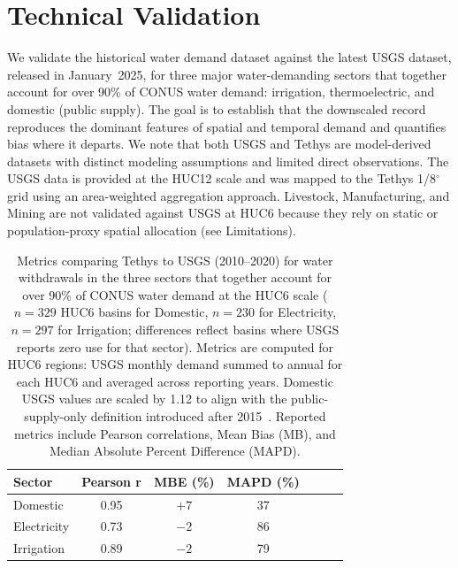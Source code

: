 \documentclass[fleqn,10pt]{wlscirep}
\begin{document}
\section*{Technical Validation}

We validate the historical water demand dataset against the latest USGS dataset\cite{Stets2025USGS}, released in January~2025, for three major water-demanding sectors that together account for over 90\% of CONUS water demand: irrigation, thermoelectric, and domestic (public supply)\cite{skinnerWaterWithdrawalConsumption2025}. The goal is to establish that the downscaled record reproduces the dominant features of spatial and temporal demand and quantifies bias where it departs. We note that both USGS and Tethys are model-derived datasets with distinct modeling assumptions and limited direct observations. The USGS data is provided at the HUC12 scale and was mapped to the Tethys 1/8$^{\circ}$ grid using an area-weighted aggregation approach. Livestock, Manufacturing, and Mining are not validated against USGS at HUC6 because they rely on static or population-proxy spatial allocation (see Limitations).


\begin{table}[!ht]
\centering
\begin{tabular}{lcccccc}
\toprule
\textbf{Sector} & \textbf{Pearson r} & \textbf{MBE (\%)} & \textbf{MAPD (\%)} \\
\midrule
Domestic     & 0.95 & $+7$  & 37 \\
Electricity  & 0.73 & $-2$  & 86 \\
Irrigation   & 0.89 & $-2$  & 79 \\
\bottomrule
\end{tabular}
\caption{Metrics comparing Tethys to USGS (2010--2020) for water withdrawals in the three sectors that together account for over 90\% of CONUS water demand at the HUC6 scale ($n=329$ HUC6 basins for Domestic, $n=230$ for Electricity, $n=297$ for Irrigation; differences reflect basins where USGS reports zero use for that sector). Metrics are computed for HUC6 regions: USGS monthly demand summed to annual for each HUC6 and averaged across reporting years. Domestic USGS values are scaled by 1.12 to align with the public-supply-only definition introduced after 2015~\cite{Stets2025USGS}. Reported metrics include Pearson correlations, Mean Bias (MB), and Median Absolute Percent Difference (MAPD).}
\label{tab:validation-metrics}
\end{table}
\end{document}
